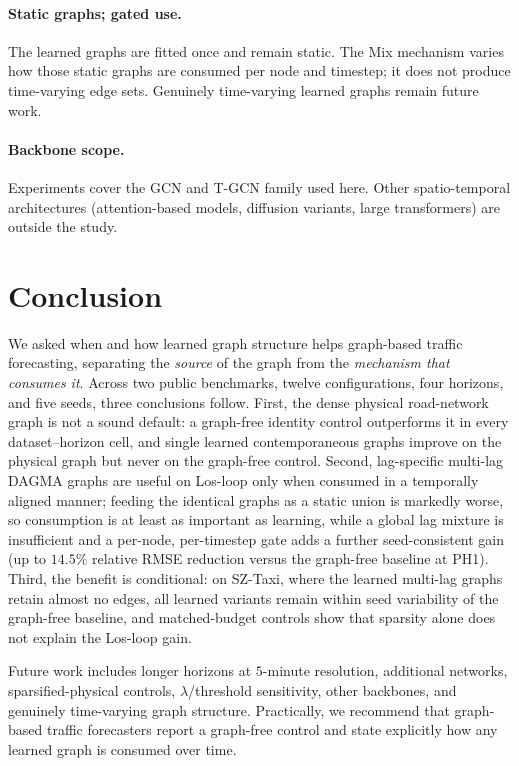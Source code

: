 \paragraph{Static graphs; gated use.}
The learned graphs are fitted once and remain static. The Mix mechanism
varies how those static graphs are consumed per node and timestep; it does
not produce time-varying edge sets. Genuinely time-varying learned graphs
remain future work.

\paragraph{Backbone scope.}
Experiments cover the GCN and T-GCN family used here. Other spatio-temporal
architectures (attention-based models, diffusion variants, large
transformers) are outside the study.

\section{Conclusion}\label{sec:conclusion}

We asked when and how learned graph structure helps graph-based traffic
forecasting, separating the \emph{source} of the graph from the
\emph{mechanism that consumes it}. Across two public benchmarks, twelve
configurations, four horizons, and five seeds, three conclusions follow.
First, the dense physical road-network graph is not a sound default: a
graph-free identity control outperforms it in every dataset--horizon cell,
and single learned contemporaneous graphs improve on the physical graph but
never on the graph-free control. Second, lag-specific multi-lag DAGMA
graphs are useful on Los-loop only when consumed in a temporally aligned
manner; feeding the identical graphs as a static union is markedly worse,
so consumption is at least as important as learning, while a global lag
mixture is insufficient and a per-node, per-timestep gate adds a further
seed-consistent gain (up to $14.5\%$ relative RMSE reduction versus the
graph-free baseline at PH1). Third, the benefit is conditional: on SZ-Taxi,
where the learned multi-lag graphs retain almost no edges, all learned
variants remain within seed variability of the graph-free baseline, and
matched-budget controls show that sparsity alone does not explain the
Los-loop gain.

Future work includes longer horizons at $5$-minute resolution, additional
networks, sparsified-physical controls, $\lambda$/threshold sensitivity,
other backbones, and genuinely time-varying graph structure. Practically,
we recommend that graph-based traffic forecasters report a graph-free
control and state explicitly how any learned graph is consumed over time.
